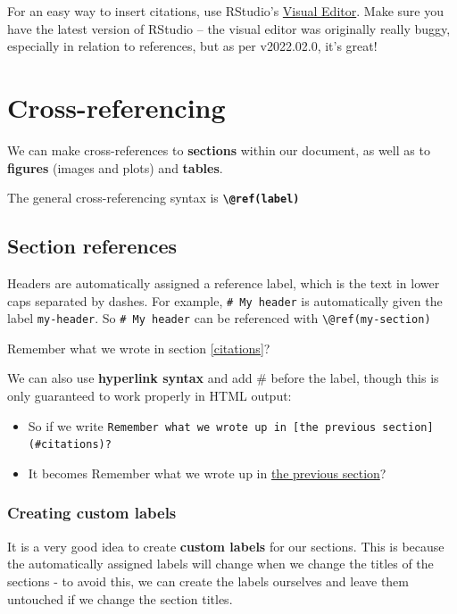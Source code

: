 \documentclass[a4paper, nobind]{templates/ociamthesis}
\providecommand{\tightlist}{%
  \setlength{\itemsep}{0pt}\setlength{\parskip}{0pt}}
\begin{document}
For an easy way to insert citations, use RStudio's \href{https://rstudio.github.io/visual-markdown-editing/citations.html}{Visual Editor}.
Make sure you have the latest version of RStudio -- the visual editor was originally really buggy, especially in relation to references, but as per v2022.02.0, it's great!

\section{Cross-referencing}\label{cross-referencing}

We can make cross-references to \textbf{sections} within our document, as well as to \textbf{figures} (images and plots) and \textbf{tables}.

The general cross-referencing syntax is \textbf{\texttt{\textbackslash{}@ref(label)}}

\subsection{Section references}\label{section-references}

Headers are automatically assigned a reference label, which is the text in lower caps separated by dashes. For example, \texttt{\#\ My\ header} is automatically given the label \texttt{my-header}. So \texttt{\#\ My\ header} can be referenced with \texttt{\textbackslash{}@ref(my-section)}

Remember what we wrote in section \ref{citations}?

We can also use \textbf{hyperlink syntax} and add \# before the label, though this is only guaranteed to work properly in HTML output:

\begin{itemize}
\tightlist
\item
  So if we write \texttt{Remember\ what\ we\ wrote\ up\ in\ {[}the\ previous\ section{]}(\#citations)?}
\item
  It becomes Remember what we wrote up in \hyperref[citations]{the previous section}?
\end{itemize}

\subsubsection{Creating custom labels}\label{creating-custom-labels}

It is a very good idea to create \textbf{custom labels} for our sections. This is because the automatically assigned labels will change when we change the titles of the sections - to avoid this, we can create the labels ourselves and leave them untouched if we change the section titles.
\end{document}
